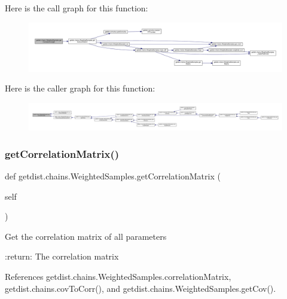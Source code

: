 Here is the call graph for this function\+:
\nopagebreak
\begin{figure}[H]
\begin{center}
\leavevmode
\includegraphics[width=350pt]{classgetdist_1_1chains_1_1WeightedSamples_ab8aaeca64fdb6cd42357a45118901526_cgraph}
\end{center}
\end{figure}
Here is the caller graph for this function\+:
\nopagebreak
\begin{figure}[H]
\begin{center}
\leavevmode
\includegraphics[width=350pt]{classgetdist_1_1chains_1_1WeightedSamples_ab8aaeca64fdb6cd42357a45118901526_icgraph}
\end{center}
\end{figure}
\mbox{\label{classgetdist_1_1chains_1_1WeightedSamples_a1485368ae83e8f0586697c6080fd1025}} 
\subsubsection{\texorpdfstring{get\+Correlation\+Matrix()}{getCorrelationMatrix()}}
{\footnotesize\ttfamily def getdist.\+chains.\+Weighted\+Samples.\+get\+Correlation\+Matrix (\begin{DoxyParamCaption}\item[{}]{self }\end{DoxyParamCaption})}

\begin{DoxyVerb}Get the correlation matrix of all parameters

:return: The correlation matrix
\end{DoxyVerb}
 

References getdist.\+chains.\+Weighted\+Samples.\+correlation\+Matrix, getdist.\+chains.\+cov\+To\+Corr(), and getdist.\+chains.\+Weighted\+Samples.\+get\+Cov().



